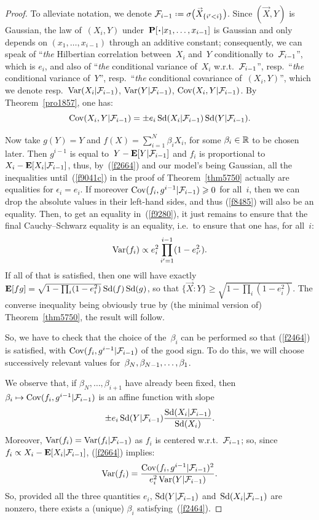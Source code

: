 \begingroup{}\begin{proof}
To alleviate notation, we denote $\mcal{F}_{i-1} \coloneqq \sigma\big(\vec{X}_{\{i'<i\}}\big)$.
Since $(\vec{X},Y)$ is Gaussian, the law of~$(X_i,Y)$
under~$\Pr[\Bcdot|\ab x_1,\ldots,x_{i-1}]$ is Gaussian and only depends on
$(x_1,\ldots,x_{i-1})$ through an additive constant;
%
consequently, we can speak of ``\emph{the} Hilbertian correlation between~$X_i$ and~$Y$ conditionally to~$\mathcal{F}_{i-1}$'', which is $e_i$,
and also of ``\emph{the} conditional variance of~$X_i$ w.r.t.~$\mathcal{F}_{i-1}$'',
resp.\ ``\emph{the} conditional variance of~$Y$'', resp.\ ``\emph{the} conditional covariance of~$(X_i,Y)$'',
which we denote resp.~$\operatorname{Var}(X_i|\mathcal{F}_{i-1})$, $\operatorname{Var}(Y|\mathcal{F}_{i-1})$,
$\operatorname{Cov}(X_i,Y|\mathcal{F}_{i-1})$. By Theorem~\ref{pro1857}, one has:
\[\label{f2664}
\operatorname{Cov}(X_i,Y|\mathcal{F}_{i-1}) = \pm e_i \operatorname{Sd}(X_i|\mathcal{F}_{i-1}) \operatorname{Sd}(Y|\mathcal{F}_{i-1}) .\]

Now take $g(Y) = Y$ and $f(X) = \sum_{i=1}^{N} \beta_i X_i$,
for some $\beta_i \in \mathbb{R}$ to be chosen later.
Then $g^{i-1}$ is equal to~$Y - \mathop{\smash{\mathbf{E}}}\nolimits[Y|\mathcal{F}_{i-1}]$ and $f_i$ is proportional
to~$X_i - \mathop{\smash{\mathbf{E}}}\nolimits[X_i|\mathcal{F}_{i-1}]$, thus, by~(\ref{f2664}) and our model's being Gaussian,
all the inequalities until~(\ref{f9041c}) in the proof of Theorem~\ref{thm5750}
actually are equalities for $\epsilon_i = e_i$.
If moreover $\operatorname{Cov}(f_i,g^{i-1}|\mathcal{F}_{i-1}) \geqslant 0$ for all~$i$,
then we can drop the absolute values in their left-hand sides,
and thus (\ref{f8485}) will also be an equality.
Then, to get an equality in~(\ref{f9280}), it just remains to ensure
that the final Cauchy--Schwarz equality is an equality,
i.e.\ to ensure that one has, for all~$i$:
\[\label{f2464} \operatorname{Var}(f_i) \propto e_i^2 \prod_{i'=1}^{i-1} (1-e_{i'}^2) .\]
%
If all of that is satisfied, then one will have exactly
$\mathop{\smash{\mathbf{E}}}\nolimits[fg] = \sqrt{1-\prod_{i}(1-e_i^2)} \allowbreak \hspace{.056em} \operatorname{Sd}(f)\operatorname{Sd}(g)$,
so that $\{\vec{X}:Y\} \geq \sqrt{1-\prod_{i}(1-e_i^2)}$.
The converse inequality being obviously true
by (the minimal version of) Theorem~\ref{thm5750},
the result will follow.

So, we have to check that the choice of the~$\beta_i$ can be performed so that
(\ref{f2464}) is satisfied, with $\operatorname{Cov}(f_i,g^{i-1}|\mathcal{F}_{i-1})$ of the good sign.
To do this, we will choose successively
relevant values for~$\beta_N,\allowbreak \beta_{N-1},\allowbreak \ldots,\allowbreak \beta_1$.

We observe that, if $\beta_N,\ldots,\beta_{i+1}$ have already been fixed, then
$\beta_i \mapsto \operatorname{Cov}(f_i,g^{i-1}|\mathcal{F}_{i-1})$
is an affine function with slope
\[ \pm e_i \operatorname{Sd}(Y|\mathcal{F}_{i-1}) \frac{\operatorname{Sd}(X_i|\mathcal{F}_{i-1})}{\operatorname{Sd}(X_i)} .\]
Moreover, $\operatorname{Var}(f_i) = \operatorname{Var}(f_i|\mathcal{F}_{i-1})$ as $f_i$ is centered w.r.t.~$\mathcal{F}_{i-1}$;
so, since $f_i \propto X_i - \mathop{\smash{\mathbf{E}}}\nolimits[X_i|\mathcal{F}_{i-1}]$, (\ref{f2664}) implies:
\[ \operatorname{Var}(f_i) = \frac{\operatorname{Cov}(f_i,g^{i-1}|\mathcal{F}_{i-1})^2}{e_i^2 \operatorname{Var}(Y|\mathcal{F}_{i-1})} .\]
%
So, provided all the three quantities $e_i$, $\operatorname{Sd}(Y|\mathcal{F}_{i-1})$ and~$\operatorname{Sd}(X_i|\mathcal{F}_{i-1})$ are nonzero,
there exists a (unique) $\beta_i$ satisfying~(\ref{f2464}).


\end{proof}
